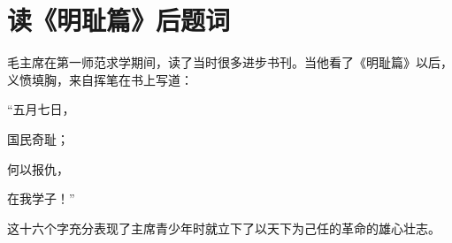 
\section{读《明耻篇》后题词}
毛主席在第一师范求学期间，读了当时很多进步书刊。当他看了《明耻篇》以后，义愤填胸，来自挥笔在书上写道：
\begin{center}
“五月七日，\par{}国民奇耻；\par{}何以报仇，\par{}  在我学子！”
\end{center}

这十六个字充分表现了主席青少年时就立下了以天下为己任的革命的雄心壮志。